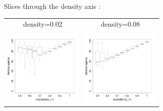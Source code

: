 \documentclass[8pt, handout=show,notes=show]{beamer}
\begin{document}
\begin{frame}{ Slices through the density axis : }

	\renewcommand{\imgSize}{3.8cm}	
	\begin{table}[H]

		\centering
		\begin{tabular}{cc}
			density=0.02&density=0.08\\
			\includegraphics[width=\imgSize]{images/alive_r1_density-2.png}&
			\includegraphics[width=\imgSize]{images/alive_r1_density-8.png}\\

\end{tabular}
\end{table}
\end{frame}
\end{document}
